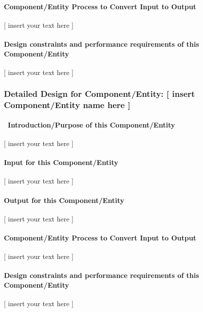 \documentclass[twoside,letterpaper]{article}
\begin{document}
\paragraph{Component/Entity Process to Convert Input to Output}
{\color{black}
[ insert your text here ]}

\paragraph{Design constraints and performance requirements of this
Component/Entity}
{\color{black}
[ insert your text here ]}

\subsubsection{Detailed Design for Component/Entity: [ insert
Component/Entity name here ]}
\paragraph[\ Introduction/Purpose of this
Component/Entity]{\ Introduction/Purpose of this Component/Entity}
{\color{black}
[ insert your text here ]}

\paragraph{Input for this Component/Entity}
{\color{black}
[ insert your text here ]}

\paragraph{Output for this Component/Entity}
{\color{black}
[ insert your text here ]}

\paragraph{Component/Entity Process to Convert Input to Output}
{\color{black}
[ insert your text here ]}

\paragraph{Design constraints and performance requirements of this
Component/Entity}
{\color{black}
[ insert your text here ]}
\end{document}
